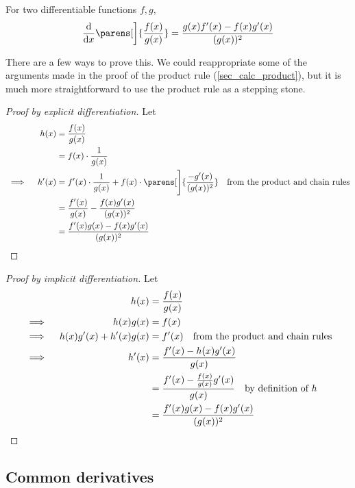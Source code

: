 \begin{theorem}
For two differentiable functions \(f, g\),
\begin{equation*}
    \dv{x}\parens[\bigg]{\frac{f(x)}{g(x)}} = \frac{g(x)f'(x) - f(x)g'(x)}{(g(x))^2}
\end{equation*}
\end{theorem}
There are a few ways to prove this. We could reappropriate some of the arguments
made in the proof of the product rule (\ref{sec_calc_product}), but it is much
more straightforward to use the product rule as a stepping stone.
\begin{proof}[Proof by explicit differentiation]
    Let
    \begin{alignat*}{2}
        && h(x) &= \frac{f(x)}{g(x)} \\
        &&      &= f(x) \cdot \frac 1{g(x)} \\
        &\implies{}& h'(x)
                &= f'(x) \cdot \frac 1{g(x)}
                    + f(x) \cdot \parens[\Bigg]{\frac{-g'(x)}{(g(x))^2}}
                    \quad \text{from the product and chain rules} \\
        &&      &= \frac{f'(x)}{g(x)} - \frac{f(x)g'(x)}{(g(x))^2} \\
        &&      &= \frac{f'(x)g(x) - f(x)g'(x)}{(g(x))^2} \qedhere
    \end{alignat*}
\end{proof}
\begin{proof}[Proof by implicit differentiation]
    Let
    \begin{alignat*}{2}
        && h(x) &= \frac{f(x)}{g(x)} \\
        &\implies{}& h(x)g(x) &= f(x) \\
        &\implies{}& h(x)g'(x) + h'(x)g(x)
                &= f'(x) \quad \text{from the product and chain rules} \\
        &\implies{}& h'(x)
                &= \frac{f'(x) - h(x)g'(x)}{g(x)} \\
        &&      &= \frac{f'(x) - \frac{f(x)}{g(x)}g'(x)}{g(x)}
                    \quad \text{by definition of \(h\)} \\
        &&      &= \frac{f'(x)g(x) - f(x)g'(x)}{(g(x))^2} \qedhere
    \end{alignat*}
\end{proof}

\subsection{Common derivatives} \label{calc_common}


